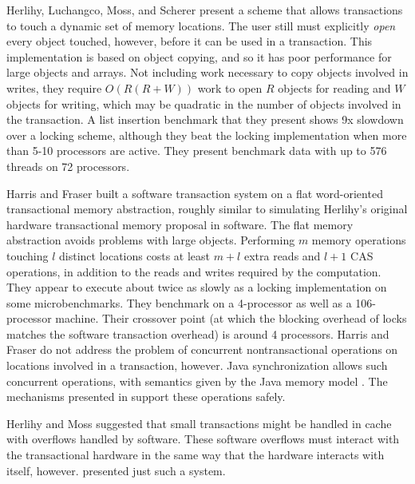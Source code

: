 Herlihy, Luchangco, Moss, and Scherer \cite{HerlihyLuMoSc03} present a
scheme that
allows transactions to touch a dynamic set of memory locations.
The user still must explicitly \emph{open} every object touched, however,
before it can be used in a transaction.  This implementation is based
on object copying, and so it has poor performance for large objects and
arrays.  Not including work necessary to copy objects involved in
writes, they require $O(R(R+W))$ work to open $R$ objects for reading
and $W$ objects for writing, which may be quadratic in the number of objects
involved in the transaction.   A list insertion benchmark that they
present shows 9x slowdown over a locking scheme, although they beat the locking
implementation when more than 5-10 processors are active.  They
present benchmark data with up to 576 threads on 72 processors.

Harris and Fraser \cite{HarrisFr03} built a software transaction
system on a flat
word-oriented transactional memory abstraction,
roughly similar to simulating Herlihy's original hardware
transactional memory proposal in software.  The flat memory abstraction avoids problems with
large objects.  Performing $m$ memory operations touching $l$ distinct
locations costs at least $m+l$ extra reads and $l+1$ CAS operations, in
addition to the reads and writes required by the computation.
They appear to execute about twice as slowly as a locking
implementation on some microbenchmarks.  They benchmark on a
4-processor as well as a 106-processor machine.  Their crossover point
(at which the blocking overhead of locks matches the software
transaction overhead) is around 4 processors.
Harris and Fraser do not address the problem of
concurrent nontransactional operations on locations involved in a
transaction, however.  Java synchronization allows such concurrent operations,
with semantics given by the Java memory model \cite{MansonPu01a,MansonPu01b,MansonPuAd05}.
The mechanisms presented in  support these operations safely.


Herlihy and Moss \cite{HerlihyMo93} suggested that small transactions
might be handled in cache with overflows handled by software.  These
software overflows must interact with the transactional hardware in
the same way that the hardware interacts with itself, however.
 presented just such a system.


